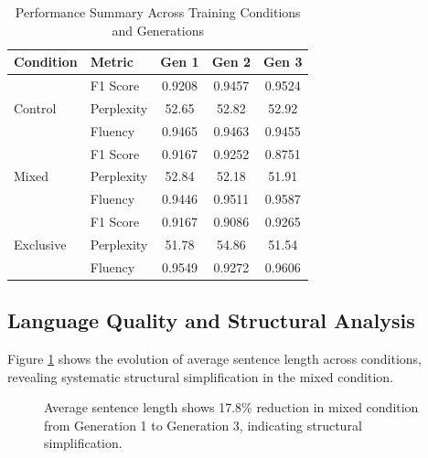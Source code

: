 \documentclass{article}
\begin{document}
\begin{table}[H]
\centering
\caption{Performance Summary Across Training Conditions and Generations}
\label{tab:performance_summary}
\begin{tabular}{llccc}
\toprule
\textbf{Condition} & \textbf{Metric} & \textbf{Gen 1} & \textbf{Gen 2} & \textbf{Gen 3} \\
\midrule
\multirow{3}{*}{Control} & F1 Score & 0.9208 & 0.9457 & 0.9524 \\
 & Perplexity & 52.65 & 52.82 & 52.92 \\
 & Fluency & 0.9465 & 0.9463 & 0.9455 \\
\midrule
\multirow{3}{*}{Mixed} & F1 Score & 0.9167 & 0.9252 & 0.8751 \\
 & Perplexity & 52.84 & 52.18 & 51.91 \\
 & Fluency & 0.9446 & 0.9511 & 0.9587 \\
\midrule
\multirow{3}{*}{Exclusive} & F1 Score & 0.9167 & 0.9086 & 0.9265 \\
 & Perplexity & 51.78 & 54.86 & 51.54 \\
 & Fluency & 0.9549 & 0.9272 & 0.9606 \\
\bottomrule
\end{tabular}
\end{table}

\subsection{Language Quality and Structural Analysis}

Figure \ref{fig:sentence_length} shows the evolution of average sentence length across conditions, revealing systematic structural simplification in the mixed condition.

\begin{figure}[H]
\centering
{}
\caption{Average sentence length shows 17.8\% reduction in mixed condition from Generation 1 to Generation 3, indicating structural simplification.}
\label{fig:sentence_length}
\end{figure}
\end{document}
